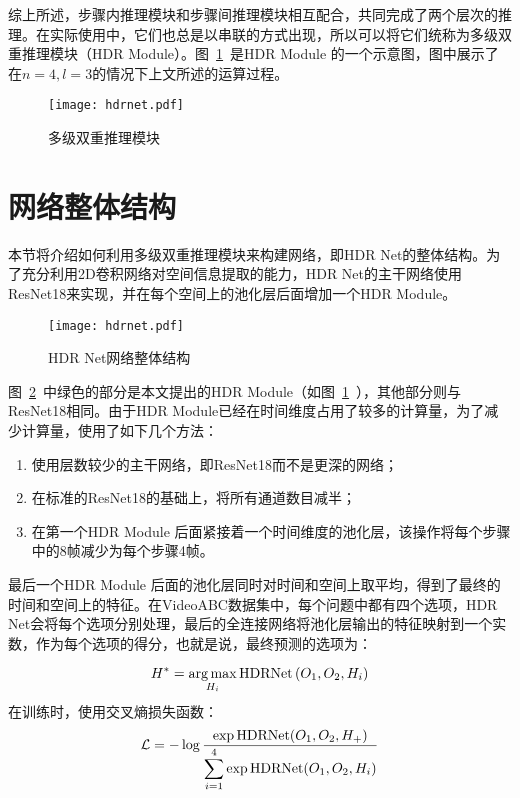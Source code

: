 综上所述，步骤内推理模块和步骤间推理模块相互配合，共同完成了两个层次的推理。在实际使用中，它们也总是以串联的方式出现，所以可以将它们统称为多级双重推理模块（HDR Module）。图~\ref{fig:HDR_Module}~是HDR Module 的一个示意图，图中展示了在$n=4,l=3$的情况下上文所述的运算过程。
\begin{figure}[htbp]
    \centering
    \texttt{[image: hdrnet.pdf]}
    \caption{多级双重推理模块}
    \label{fig:HDR_Module}
\end{figure}
\section{网络整体结构}\label{sec:whole}
本节将介绍如何利用多级双重推理模块来构建网络，即HDR Net的整体结构。为了充分利用2D卷积网络对空间信息提取的能力，HDR Net的主干网络使用ResNet18\cite{he2016deep}来实现，并在每个空间上的池化层后面增加一个HDR Module。

\begin{figure}[htbp]
    \centering
    \texttt{[image: hdrnet.pdf]}
    \caption{HDR Net网络整体结构}
    \label{fig:hdrnet}
\end{figure}
图~\ref{fig:hdrnet}~中绿色的部分是本文提出的HDR Module（如图~\ref{fig:HDR_Module}~），其他部分则与ResNet18相同。由于HDR Module已经在时间维度占用了较多的计算量，为了减少计算量，使用了如下几个方法：
\begin{enumerate}
    \item 使用层数较少的主干网络，即ResNet18而不是更深的网络；
    \item 在标准的ResNet18的基础上，将所有通道数目减半；
    \item 在第一个HDR Module 后面紧接着一个时间维度的池化层，该操作将每个步骤中的8帧减少为每个步骤4帧。
\end{enumerate}

最后一个HDR Module 后面的池化层同时对时间和空间上取平均，得到了最终的时间和空间上的特征。在VideoABC数据集中，每个问题中都有四个选项，HDR Net会将每个选项分别处理，最后的全连接网络将池化层输出的特征映射到一个实数，作为每个选项的得分，也就是说，最终预测的选项为：

\begin{equation}
    H^* = \operatorname*{arg\,max}_{H_i} \operatorname{HDRNet}\left(O_1, O_2, H_i\right)
\end{equation}
在训练时，使用交叉熵损失函数：
\begin{equation}
    {\mathcal{L}} = -\log\frac{\exp{\operatorname{HDRNet}(O_1, O_2, H_+)}}{\displaystyle\sum_{i=1}^4\exp{\operatorname{HDRNet}(O_1, O_2, H_i)}}
\end{equation}

